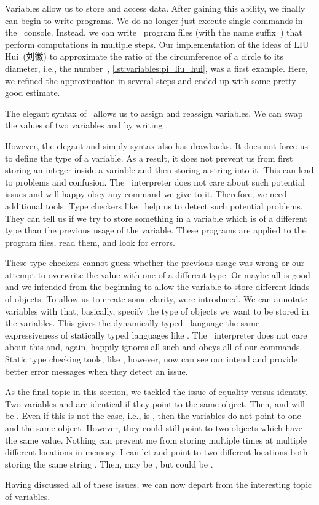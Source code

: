%
%
Variables allow us to store and access data.
After gaining this ability, we finally can begin to write  programs.
We do no longer just execute single commands in the \python\ console.
Instead, we can write \python\ program files (with the name suffix~) that perform computations in multiple steps.
Our implementation of the ideas of LIU Hui~(刘徽) to approximate the ratio of the circumference of a circle to its diameter, i.e., the number~\numberPi, \cref{lst:variables:pi_liu_hui}, was a first example.
Here, we refined the approximation in several steps and ended up with some pretty good estimate.

The elegant syntax of \python\ allows us to assign and reassign variables.
We can swap the values of two variables  and  by writing .

However, the elegant and simply syntax also has drawbacks.
It does not force us to define the type of a variable.
As a result, it does not prevent us from first storing an integer inside a variable and then storing a string into it.
This can lead to problems and confusion.
The \python\ interpreter does not care about such potential issues and will happy obey any command we give to it.
Therefore, we need additional tools:
Type checkers like \mypy\ help us to detect such potential problems.
They can tell us if we try to store something in a variable which is of a different type than the previous usage of the variable.
These programs are applied to the program files, read them, and look for errors.

These type checkers cannot guess whether the previous usage was wrong or our attempt to overwrite the value with one of a different type.
Or maybe all is good and we intended from the beginning to allow the variable to store different kinds of objects.
To allow us to create some clarity,  were introduced.
We can annotate variables with  that, basically, specify the type of objects we want to be stored in the variables.
This gives the dynamically typed \python\ language the same expressiveness of statically typed languages like .
The \python\ interpreter does not care about this and, again, happily ignores all such  and obeys all of our commands.
Static type checking tools, like \mypy, however, now can see our intend and provide better error messages when they detect an issue.

As the final topic in this section, we tackled the issue of equality versus identity.
Two variables  and  are identical if they point to the same object.
Then,  and  will be .
Even if this is not the case, i.e.,  is , then the variables do not point to one and the same object.
However, they could still point to two objects which have the same value.
Nothing can prevent me from storing  multiple times at multiple different locations in memory.
I can let  and  point to two different locations both storing the same string .
Then,  may be , but  could be .

Having discussed all of these issues, we can now depart from the interesting topic of variables.%
%
\endhsection%
%
